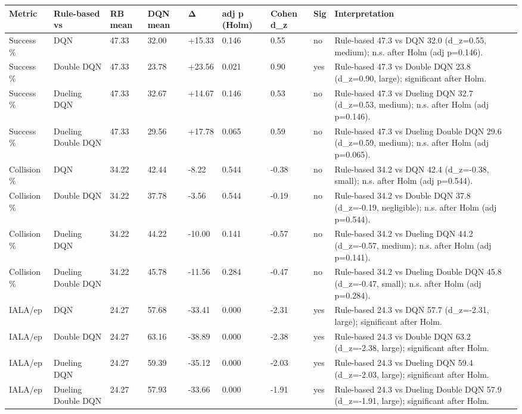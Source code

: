 \begin{tabular}{lllllllll}
\toprule
Metric & Rule-based vs & RB mean & DQN mean & Δ & adj p (Holm) & Cohen d\_z & Sig & Interpretation \\
\midrule
Success \% & DQN & 47.33 & 32.00 & +15.33 & 0.146 & 0.55 & no & Rule-based 47.3 vs DQN 32.0 (d\_z=0.55, medium); n.s. after Holm (adj p=0.146). \\
Success \% & Double DQN & 47.33 & 23.78 & +23.56 & 0.021 & 0.90 & yes & Rule-based 47.3 vs Double DQN 23.8 (d\_z=0.90, large); significant after Holm. \\
Success \% & Dueling DQN & 47.33 & 32.67 & +14.67 & 0.146 & 0.53 & no & Rule-based 47.3 vs Dueling DQN 32.7 (d\_z=0.53, medium); n.s. after Holm (adj p=0.146). \\
Success \% & Dueling Double DQN & 47.33 & 29.56 & +17.78 & 0.065 & 0.59 & no & Rule-based 47.3 vs Dueling Double DQN 29.6 (d\_z=0.59, medium); n.s. after Holm (adj p=0.065). \\
Collision \% & DQN & 34.22 & 42.44 & -8.22 & 0.544 & -0.38 & no & Rule-based 34.2 vs DQN 42.4 (d\_z=-0.38, small); n.s. after Holm (adj p=0.544). \\
Collision \% & Double DQN & 34.22 & 37.78 & -3.56 & 0.544 & -0.19 & no & Rule-based 34.2 vs Double DQN 37.8 (d\_z=-0.19, negligible); n.s. after Holm (adj p=0.544). \\
Collision \% & Dueling DQN & 34.22 & 44.22 & -10.00 & 0.141 & -0.57 & no & Rule-based 34.2 vs Dueling DQN 44.2 (d\_z=-0.57, medium); n.s. after Holm (adj p=0.141). \\
Collision \% & Dueling Double DQN & 34.22 & 45.78 & -11.56 & 0.284 & -0.47 & no & Rule-based 34.2 vs Dueling Double DQN 45.8 (d\_z=-0.47, small); n.s. after Holm (adj p=0.284). \\
IALA/ep & DQN & 24.27 & 57.68 & -33.41 & 0.000 & -2.31 & yes & Rule-based 24.3 vs DQN 57.7 (d\_z=-2.31, large); significant after Holm. \\
IALA/ep & Double DQN & 24.27 & 63.16 & -38.89 & 0.000 & -2.38 & yes & Rule-based 24.3 vs Double DQN 63.2 (d\_z=-2.38, large); significant after Holm. \\
IALA/ep & Dueling DQN & 24.27 & 59.39 & -35.12 & 0.000 & -2.03 & yes & Rule-based 24.3 vs Dueling DQN 59.4 (d\_z=-2.03, large); significant after Holm. \\
IALA/ep & Dueling Double DQN & 24.27 & 57.93 & -33.66 & 0.000 & -1.91 & yes & Rule-based 24.3 vs Dueling Double DQN 57.9 (d\_z=-1.91, large); significant after Holm. \\

\end{tabular}
